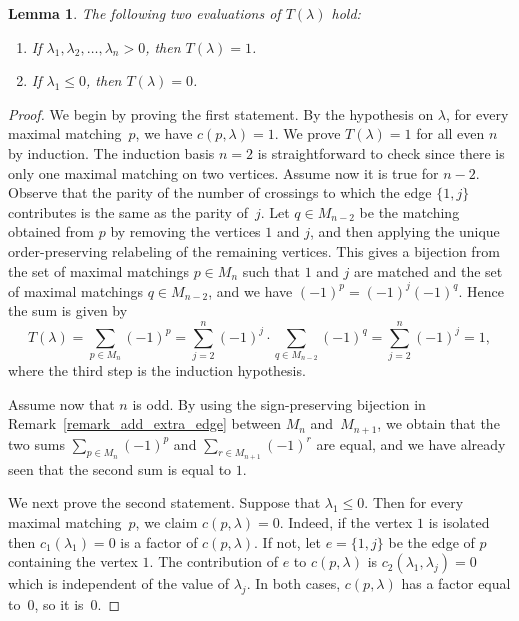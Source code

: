 \documentclass[10pt]{amsart}
\newtheorem{lemma}[theorem]{Lemma}
\theoremstyle{definition}
\begin{document}
\begin{lemma}
The following two evaluations of $T(\lambda)$ hold:
\begin{enumerate}
\item\label{lemma7.3_1} If $\lambda_{1},\lambda_{2},\ldots,\lambda_{n}>0$, then $T(\lambda)=1$.
\item\label{lemma7.3_2} If $\lambda_{1}\leq 0$, then $T(\lambda)=0$.
\end{enumerate}
\label{lemma_T_two_statements}
\end{lemma}
\begin{proof}
We begin by proving the first statement.
By the hypothesis on $\lambda$, for every maximal matching~$p$,
we have $c(p,\lambda)=1$.
We prove 
$T(\lambda) = 1$ for all even $n$ by induction.
The induction basis $n=2$ is straightforward to check
since there is only one maximal matching on two vertices.
Assume now it is true for $n-2$.
Observe that the parity of the number 
of crossings to which the edge $\{1,j\}$ contributes is
the same as the parity of~$j$. 
Let $q \in M_{n-2}$ be the matching obtained from $p$ by removing
the vertices $1$ and $j$, and then applying 
the unique order-preserving relabeling of the remaining vertices.
This gives a bijection from the set of maximal matchings $p\in M_{n}$ such that
$1$ and $j$ are matched and the set of maximal matchings $q\in M_{n-2}$, and we
have $(-1)^p=(-1)^j (-1)^q$.
Hence the sum is given by
$$
T(\lambda)
=
\sum_{p \in M_{n}} (-1)^{p}
=
\sum_{j=2}^{n}  (-1)^{j} \cdot \sum_{q \in M_{n-2}} (-1)^{q}
=
\sum_{j=2}^{n}  (-1)^{j} 
=
1 ,
$$
where the third step is the induction hypothesis.

Assume now that $n$ is odd.
By using the sign-preserving bijection in
Remark~\ref{remark_add_extra_edge}
between $M_{n}$ and~$M_{n+1}$,
we obtain that
the two sums
$\sum_{p \in M_{n}} (-1)^{p}$
and
$\sum_{r \in M_{n+1}} (-1)^{r}$
are equal, and we have already seen that the second sum is equal to $1$.



We next prove the second statement.
Suppose that $\lambda_{1} \leq 0$. 
Then for every maximal matching~$p$, we claim $c(p,\lambda)=0$. 
Indeed, if the vertex $1$ is isolated then
$c_{1}(\lambda_{1}) = 0$ is a factor of $c(p, \lambda)$.
If not, let $e = \{1,j\}$ be the edge of $p$ containing the vertex $1$.
The contribution of $e$ to $c(p,\lambda)$ is $c_{2}(\lambda_{1},\lambda_{j})=0$
which is independent of the value of $\lambda_{j}$.
In both cases, $c(p,\lambda)$ has a factor equal to~$0$, so it is~$0$. 
\end{proof}
\end{document}
